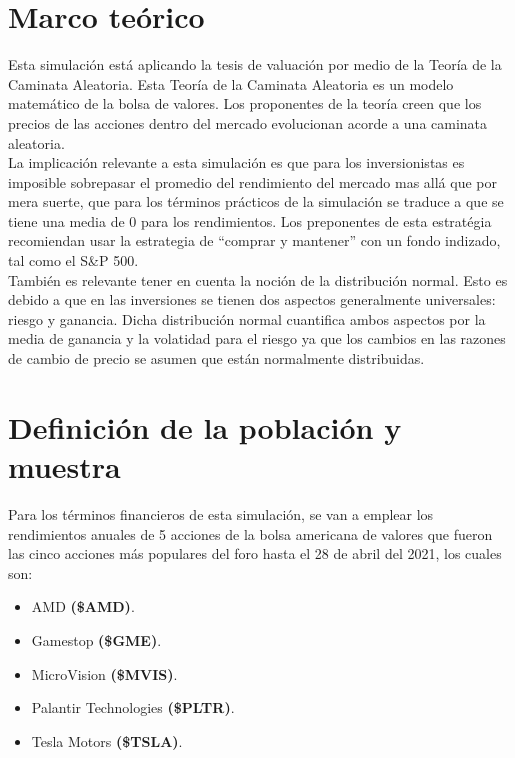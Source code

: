 \documentclass[letterpaper, 12pt]{article}
\begin{document}
\begin{justify}
        \section{Marco teórico}
        \justify
        Esta simulación está aplicando la tesis de valuación por medio de la Teoría de la Caminata Aleatoria.
        Esta Teoría de la Caminata Aleatoria es un modelo matemático de la bolsa de valores. Los proponentes de la teoría
        creen que los precios de las acciones dentro del mercado evolucionan acorde a una caminata aleatoria.
        \\\newline
        La implicación relevante a esta simulación es que para los inversionistas es imposible sobrepasar el promedio del rendimiento del mercado
        mas allá que por mera suerte, que para los términos prácticos de la simulación se traduce a que se tiene una media de 0 para los rendimientos. 
        Los preponentes de esta estratégia recomiendan usar la estrategia de ``comprar y mantener'' con un fondo indizado, tal como el S\&P 500.
        \\\newline
        También es relevante tener en cuenta la noción de la distribución normal. Esto es debido a que en las inversiones se tienen dos aspectos generalmente
        universales: riesgo y ganancia. Dicha distribución normal cuantifica ambos aspectos por la media de ganancia y la volatidad para el riesgo ya que los cambios
        en las razones de cambio de precio se asumen que están normalmente distribuidas.
        \section{Definición de la población y muestra}
        \justify
        Para los términos financieros de esta simulación, se van a emplear los rendimientos anuales de 5 acciones de la bolsa americana de valores que fueron las cinco acciones más populares del foro hasta el 28 de abril del 2021, los cuales son:
        \begin{itemize}
            \item AMD \textbf{(\$AMD)}.
            \item Gamestop \textbf{(\$GME)}.
            \item MicroVision \textbf{(\$MVIS)}.
            \item Palantir Technologies \textbf{(\$PLTR)}.
            \item Tesla Motors \textbf{(\$TSLA)}.
        \end{itemize}

\end{justify}
\end{document}
